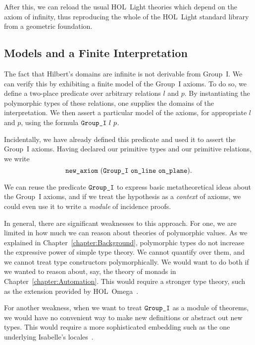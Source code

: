 After this, we can reload the usual HOL~Light theories which depend on the axiom of infinity, thus reproducing the whole of the HOL~Light standard library from a geometric foundation.

\subsection{Models and a Finite Interpretation}\label{sec:FiniteModel}
The fact that Hilbert's domains are infinite is not derivable from Group~I. We can verify this by exhibiting a finite model of the Group~I axioms. To do so, we define a two-place predicate  over arbitrary relations $l$ and $p$. By instantiating the polymorphic types of these relations, one supplies the domains of the interpretation. We then assert a particular model of the axioms, for appropriate $l$ and $p$, using the formula $\code{Group\_I}\ l\ p$.

Incidentally, we have already defined this predicate and used it to assert the Group~I axioms. Having declared our primitive types and our primitive relations, we write
\begin{displaymath}
  \code{new\_axiom}\ (\code{Group\_I}\ \code{on\_line}\ \code{on\_plane}).
\end{displaymath}

We can reuse the predicate $\texttt{Group\_I}$ to express basic metatheoretical ideas about the Group~I axioms, and if we treat the hypothesis as a \emph{context} of axioms, we could even use it to write a \emph{module} of incidence proofs. 

In general, there are significant weaknesses to this approach. For one, we are limited in how much we can reason about theories of polymorphic values. As we explained in Chapter~\ref{chapter:Background}, polymorphic types do not increase the expressive power of simple type theory. We cannot quantify over them, and we cannot treat type constructors polymorphically. We would want to do both if we wanted to reason about, say, the theory of monads in Chapter~\ref{chapter:Automation}. This would require a stronger type theory, such as the extension provided by HOL~Omega~\cite{HOLOmega}.

For another weakness, when we want to treat $\texttt{Group\_I}$ as a module of theorems, we would have no convenient way to make new definitions or abstract out new types. This would require a more sophisticated embedding such as the one underlying Isabelle's locales~\cite{IsabelleLocales}.

